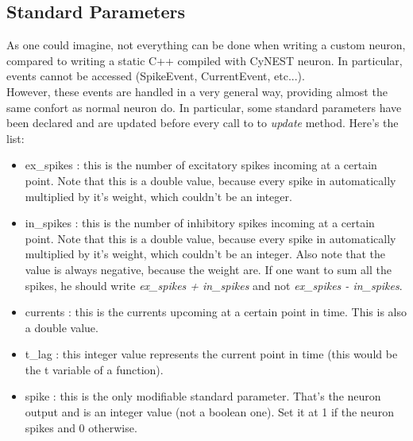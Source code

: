 \documentclass{article}
\begin{document}
\subsection*{Standard Parameters}
As one could imagine, not everything can be done when writing a custom neuron, compared to writing a static C++ compiled with CyNEST neuron. In particular, events cannot be accessed (SpikeEvent, CurrentEvent, etc...).\\
However, these events are handled in a very general way, providing almost the same confort as normal neuron do. In particular, some standard parameters have been declared and are updated before every call to to \emph{update} method. Here's the list:
\begin{itemize}
\item ex\_spikes : this is the number of excitatory spikes incoming at a certain point. Note that this is a double value, because every spike in automatically multiplied by it's weight, which couldn't be an integer.
\item in\_spikes : this is the number of inhibitory spikes incoming at a certain point. Note that this is a double value, because every spike in automatically multiplied by it's weight, which couldn't be an integer. Also note that the value is always negative, because the weight are. If one want to sum all the spikes, he should write \emph{ex\_spikes + in\_spikes} and not \emph{ex\_spikes - in\_spikes}.
\item currents : this is the currents upcoming at a certain point in time. This is also a double value.
\item t\_lag : this integer value represents the current point in time (this would be the t variable of a function).
\item spike : this is the only modifiable standard parameter. That's the neuron output and is an integer value (not a boolean one). Set it at 1 if the neuron spikes and 0 otherwise.
\end{itemize}
\end{document}
